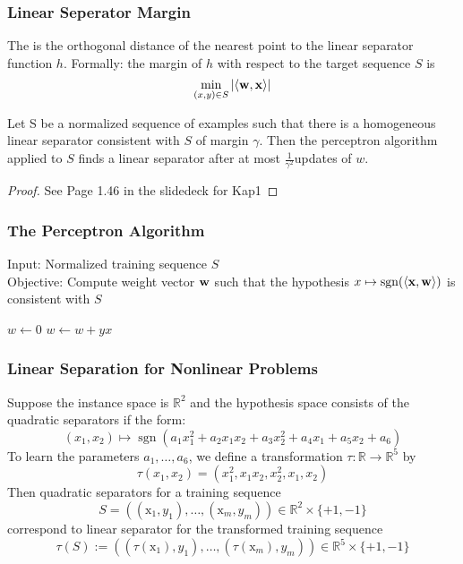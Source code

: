 \subsubsection{Linear Seperator Margin}
The  is the orthogonal distance of the nearest point to the linear separator function $h$. Formally: the margin of $h$ with respect to the target sequence $S$ is
\begin{equation}
\min_{(x, y) \in S}|\langle\mathbf{w}, \mathbf{x}\rangle|
\end{equation} 
\begin{theorem}{}
	Let S  be a normalized sequence of examples such that there is a homogeneous linear separator consistent with $S$ of margin $\gamma$. Then the perceptron algorithm applied to $S$ finds a linear separator after at most $\frac{1}{\gamma^2}$updates of $w$.
\end{theorem}
\begin{proof}{}
	See Page 1.46 in the slidedeck for Kap1
\end{proof}
\subsubsection{The Perceptron Algorithm}
Input: Normalized training sequence $S$\\
Objective: Compute weight vector $\mathbf{w}$ such that the hypothesis $x \mapsto \operatorname{sgn}(\langle\mathbf{x},\mathbf{w}\rangle)$ is consistent with $S$

\begin{algorithmic}
	\State $w\gets 0$
	\Repeat 
			\State $w \gets w + yx$
		\EndIf
		\EndFor
\end{algorithmic}
\subsubsection{Linear Separation for Nonlinear Problems}
Suppose the instance space is $\mathbb{R}^2$ and the hypothesis space consists of the quadratic separators if the form:
\begin{equation}
(x_1, x_2) \mapsto \operatorname{sgn}(a_1 x_1^2+a_2 x_1 x_2+a_3 x_2^2+a_4 x_1+a_5 x_2+a_6)
\end{equation}
To learn the parameters $a_1,\ldots,a_6$, we define a transformation $\tau :\mathbb{R} \rightarrow \mathbb{R}^5$ by
\begin{equation}
\tau(x_1,x_2) = (x_1^2,x_1x_2,x_2^2,x_1,x_2)
\end{equation}
Then quadratic separators for a training sequence
\begin{equation}
S=((\mathrm{x}_{1}, y_{1}), \ldots,(\mathrm{x}_{m}, y_{m})) \in \mathbb{R}^{2} \times\{+1,-1\}
\end{equation}
correspond to linear separator for the transformed training sequence
\begin{equation}
\tau(S) :=((\tau(\mathrm{x}_{1}), y_{1}), \ldots,(\tau(\mathrm{x}_{m}), y_{m})) \in \mathbb{R}^{5} \times\{+1,-1\}
\end{equation}
